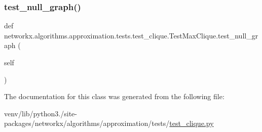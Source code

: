 \subsubsection{\texorpdfstring{test\+\_\+null\+\_\+graph()}{test\_null\_graph()}}
{\footnotesize\ttfamily def networkx.\+algorithms.\+approximation.\+tests.\+test\+\_\+clique.\+Test\+Max\+Clique.\+test\+\_\+null\+\_\+graph (\begin{DoxyParamCaption}\item[{}]{self }\end{DoxyParamCaption})}



The documentation for this class was generated from the following file\+:\begin{DoxyCompactItemize}
\item 
venv/lib/python3./site-\/packages/networkx/algorithms/approximation/tests/\hyperlink{approximation_2tests_2test__clique_8py}{test\+\_\+clique.\+py}\end{DoxyCompactItemize}
